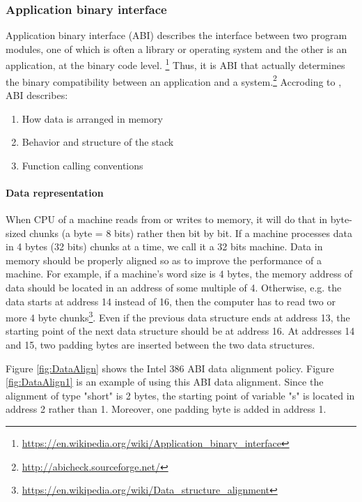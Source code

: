         \subsubsection{Application binary interface}
            Application binary interface (ABI) describes the interface between two program modules, one of which is often a library or operating system  and the other is an application, at the binary code level. \footnote{\url{https://en.wikipedia.org/wiki/Application\_binary\_interface}}
            Thus, it is ABI that actually determines the binary compatibility between an application and a system.\footnote{\url{http://abicheck.sourceforge.net/}}\newline    
           Accroding to \cite{ALTERA-14}, ABI describes:   
           \begin{enumerate}
              \item  How data is arranged in memory
              \item  Behavior and structure of the stack
              \item  Function calling conventions
            \end{enumerate}
            
        
            
            \paragraph{Data representation}
            When CPU of a machine reads from or writes to memory, it will do that in byte-sized chunks (a byte = 8 bits) rather then bit by bit. If a machine processes data in 4 bytes (32 bits) chunks at a time, we call it a 32 bits machine. Data in memory should be properly aligned so as to improve the performance of a machine. For example, if a machine's word size is 4 bytes, the memory address of data should be located in an address of some multiple of 4. Otherwise, e.g. the data starts at address 14 instead of 16, then the computer has to read two or more 4 byte chunks\footnote{\url{https://en.wikipedia.org/wiki/Data_structure_alignment}}. Even if the previous data structure ends at address 13, the starting point of the next data structure should be at address 16. At addresses 14 and 15, two padding bytes are inserted between the two data structures.
            
            Figure \ref{fig:DataAlign} shows the Intel 386 ABI data alignment policy. Figure \ref{fig:DataAlign1} is an example of using this ABI data alignment. Since the alignment of type "short" is 2 bytes, the starting point of variable "s" is located in address 2 rather than 1. Moreover, one padding byte is added in address 1.
             
